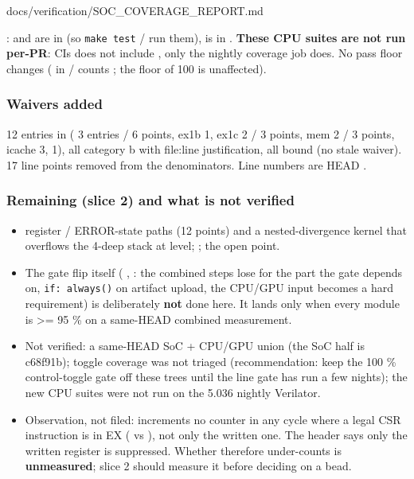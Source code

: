 \begin{relocated}{docs/verification/SOC_COVERAGE_REPORT.md}
{}

:  and
 are in  (so
\texttt{make\ test} /  run them),
 is in . \textbf{These CPU
suites are not run per-PR}: CI\textquotesingle s  does
not include , only the nightly coverage job does. No
pass floor changes ( in  /
 counts ; the 
floor of 100 is unaffected).

\subsubsection{Waivers added}\label{tm:flow:soc-coverage-report:waivers-added}

12 entries in 
( 3 entries / 6 points, ex1b 1, ex1c 2 / 3 points,
mem 2 / 3 points, icache 3,  1), all category b with
file:line justification, all bound (no stale waiver). 17 line points
removed from the denominators. Line numbers are HEAD .

\subsubsection{Remaining (slice 2) and what is not verified}\label{tm:flow:soc-coverage-report:remaining-slice-2-and-what-is-not-verified}

\begin{itemize}
\tightlist
\item
   register / ERROR-state paths (12 points) and a
  nested-divergence kernel that overflows the 4-deep stack at
   level;  ; the open
    point.
\item
  The gate flip itself ( ,
  : the combined steps lose
   for the part the gate depends on,
  \texttt{if:\allowbreak{}\ always()} on artifact upload, the CPU/GPU
  input becomes a hard requirement) is deliberately \textbf{not} done
  here. It lands only when every module is \textgreater= 95 \% on a
  same-HEAD combined measurement.
\item
  Not verified: a same-HEAD SoC + CPU/GPU union (the SoC half is
  c68f91b); toggle coverage was not triaged (recommendation: keep the
  100 \% control-toggle gate off these trees until the line gate has run
  a few nights); the new CPU suites were not run on the 5.036 nightly
  Verilator.
\item
  Observation, not filed:  increments no counter in
  any cycle where a legal CSR instruction is in EX ( vs
  ), not only the written one. The header says only the
  written register is suppressed. Whether  therefore
  under-counts is \textbf{unmeasured}; slice 2 should measure it before
  deciding on a bead.
\end{itemize}


\end{relocated}

